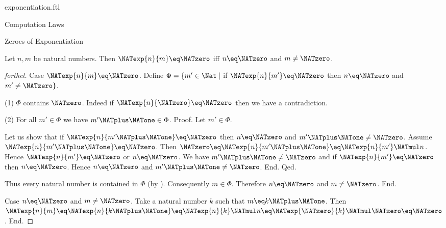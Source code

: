 \documentclass{naproche-library}
\begin{document}
\begin{smodule}[title=Exponentiation]{exponentiation.ftl}
\begin{sfragment}{Computation Laws}
  \begin{sfragment}{Zeroes of Exponentiation}
    \begin{proposition}[forthel,id=ARITHMETIC_09_3860221447372800]
      Let $n, m$ be natural numbers.
      Then $\NATexp{n}{m} \eq \NATzero$ iff $n \eq \NATzero$ and $m \neq \NATzero$.
    \end{proposition}
    \begin{proof}[forthel]
      Case $\NATexp{n}{m} \eq \NATzero$.
        Define $\Phi = \{ m' \in \Nat \mid$ if $\NATexp{n}{m'} \eq \NATzero$ then $n \eq \NATzero$ and $m' \neq \NATzero \}$.

        (1) $\Phi$ contains $\NATzero$.
        Indeed if $\NATexp{n}{\NATzero} \eq \NATzero$ then we have a contradiction.

        (2) For all $m' \in \Phi$ we have $m' \NATplus \NATone \in \Phi$. \newline
        Proof.
          Let $m' \in \Phi$.

          Let us show that if $\NATexp{n}{m' \NATplus \NATone} \eq \NATzero$ then $n \eq \NATzero$ and $m' \NATplus \NATone \neq \NATzero$.
            Assume $\NATexp{n}{m' \NATplus \NATone} \eq \NATzero$.
            Then $\NATzero \eq \NATexp{n}{m' \NATplus \NATone} \eq \NATexp{n}{m'} \NATmul n$.
            Hence $\NATexp{n}{m'} \eq \NATzero$ or $n \eq \NATzero$.
            We have $m' \NATplus \NATone \neq \NATzero$ and if $\NATexp{n}{m'} \eq \NATzero$ then $n \eq \NATzero$.
            Hence $n \eq \NATzero$ and $m' \NATplus \NATone \neq \NATzero$.
          End.
        Qed.

        Thus every natural number is contained in $\Phi$ (by ).
        Consequently $m \in \Phi$.
        Therefore $n \eq \NATzero$ and $m \neq \NATzero$.
      End.

      Case $n \eq \NATzero$ and $m \neq \NATzero$.
        Take a natural number $k$ such that $m \eq k \NATplus \NATone$.
        Then $\NATexp{n}{m}
          \eq \NATexp{n}{k \NATplus \NATone}
          \eq \NATexp{n}{k} \NATmul n
          \eq \NATexp{\NATzero}{k} \NATmul \NATzero
          \eq \NATzero$.
      End.
    \end{proof}
  \end{sfragment}
\end{sfragment}
\end{smodule}
\end{document}
